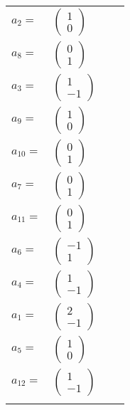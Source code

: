 \documentclass[1p]{elsarticle_modified}
\theoremstyle{definition}
\begin{document}
\begin{tabular}{m{7pt} m{180pt} m{7pt} m{180pt} }
\flushright $a_{2}=$&$\begin{pmatrix}1\\0\end{pmatrix}$ \\
\flushright $a_{8}=$&$\begin{pmatrix}0\\1\end{pmatrix}$ \\
\flushright $a_{3}=$&$\begin{pmatrix}1\\-1\end{pmatrix}$ \\
\flushright $a_{9}=$&$\begin{pmatrix}1\\0\end{pmatrix}$ \\
\flushright $a_{10}=$&$\begin{pmatrix}0\\1\end{pmatrix}$ \\
\flushright $a_{7}=$&$\begin{pmatrix}0\\1\end{pmatrix}$ \\
\flushright $a_{11}=$&$\begin{pmatrix}0\\1\end{pmatrix}$ \\
\flushright $a_{6}=$&$\begin{pmatrix}-1\\1\end{pmatrix}$ \\
\flushright $a_{4}=$&$\begin{pmatrix}1\\-1\end{pmatrix}$ \\
\flushright $a_{1}=$&$\begin{pmatrix}2\\-1\end{pmatrix}$ \\
\flushright $a_{5}=$&$\begin{pmatrix}1\\0\end{pmatrix}$ \\
\flushright $a_{12}=$&$\begin{pmatrix}1\\-1\end{pmatrix}$\\&\end{tabular}
\end{document}
